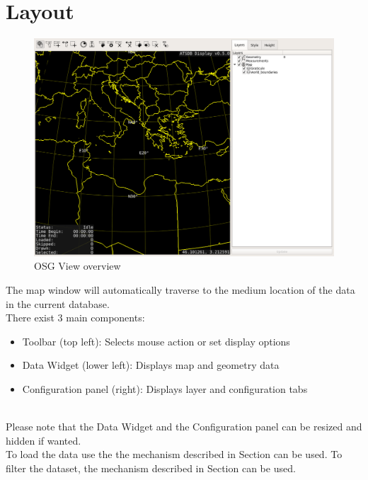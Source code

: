 \section{Layout}

\begin{figure}[H]
    \hspace*{-2.5cm}
    \includegraphics[width=19cm,frame]{../screenshots/osgview_overview.png}
  \caption{OSG View overview}
  \label{fig:osgview_overview}
\end{figure}

The map window will automatically traverse to the medium location of the data in the current database. \\

There exist 3 main components:
\begin{itemize}
 \item Toolbar (top left): Selects mouse action or set display options
 \item Data Widget (lower left): Displays map and geometry data
 \item Configuration panel (right): Displays layer and configuration tabs
\end{itemize}
\ \\

Please note that the Data Widget and the Configuration panel can be resized and hidden if wanted. \\

To load the data use the the mechanism described in Section  can be used. To filter the dataset, the mechanism described in Section  can be used. \\

